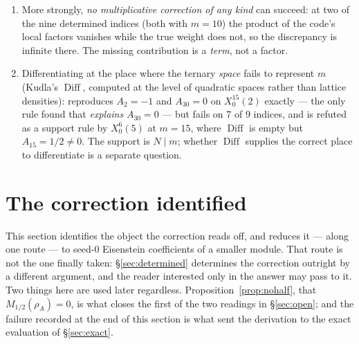 \documentclass[11pt,reqno]{amsart}
\theoremstyle{plain}
\theoremstyle{definition}
\DeclareMathOperator{\Diff}{Diff}
\begin{document}
\begin{enumerate}
      prefactors $\{\sqrt{m}/\sqrt{\lvert d\rvert},\,h/w,\,\prod(1-\chi(p)/p),\,
      \prod(1-1/p^2)^{-1}\}$ with a local rule drawn from \{the product of the $W_p(1)$; the
      derivative of that product; the derivative taken at $N$, at the primes $p\mid D$, at each
      single prime, or at the vanishing places\}, times an arbitrary constant per base, fails to
      reproduce the nine measured multipliers of $X_0^{15}(2)$.
\item More strongly, \emph{no multiplicative correction of any kind} can succeed: at two of the
      nine determined indices (both with $m=10$) the product of the code's local factors vanishes
      while the true weight does not, so the discrepancy is infinite there. The missing
      contribution is a \emph{term}, not a factor.
\item Differentiating at the place where the ternary \emph{space} fails to represent $m$
      (Kudla's $\Diff$, computed at the level of quadratic spaces rather than lattice densities):
      reproduces $A_2=-1$ and $A_{30}=0$ on $X_0^{15}(2)$ exactly --- the only rule found that
      \emph{explains} $A_{30}=0$ --- but fails on $7$ of $9$ indices, and is refuted as a support
      rule by $X_0^{6}(5)$ at $m=15$, where $\Diff$ is empty but $A_{15}=1/2\ne0$. The support is
      $N\mid m$; whether $\Diff$ supplies the correct place to differentiate is a separate
      question.
\end{enumerate}

\section{The correction identified}\label{sec:ident}

This section identifies the object the correction reads off, and reduces it --- along one
route --- to seed-$0$ Eisenstein coefficients of a smaller module. That route is not the one
finally taken: \S\ref{sec:determined} determines the correction outright by a different
argument, and the reader interested only in the answer may pass to it. Two things here are
used later regardless. Proposition~\ref{prop:nohalf}, that $M_{1/2}(\rho_A)=0$, is what
closes the first of the two readings in \S\ref{sec:open}; and the failure recorded at the end
of this section is what sent the derivation to the exact evaluation of \S\ref{sec:exact}.
\end{document}
